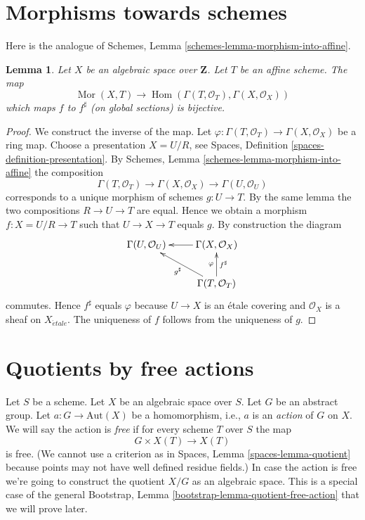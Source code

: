 \documentclass{stacks-project}
\theoremstyle{plain}
\newtheorem{lemma}[subsection]{Lemma}
\theoremstyle{definition}
\theoremstyle{remark}
\numberwithin{equation}{subsection}
\def\Hom{\mathop{\mathrm{Hom}}\nolimits}
\def\Mor{\mathop{\mathrm{Mor}}\nolimits}
\def\etale{{\acute{e}tale}}
\begin{document}
\section{Morphisms towards schemes}
\label{section-morphisms-to-schemes}

\noindent
Here is the analogue of
Schemes, Lemma \ref{schemes-lemma-morphism-into-affine}.

\begin{lemma}
\label{lemma-morphism-to-affine-scheme}
Let $X$ be an algebraic space over $\mathbf{Z}$.
Let $T$ be an affine scheme.
The map
$$
\Mor(X, T)
\longrightarrow
\Hom(\Gamma(T, \mathcal{O}_T), \Gamma(X, \mathcal{O}_X))
$$
which maps $f$ to $f^\sharp$ (on global sections) is bijective.
\end{lemma}

\begin{proof}
We construct the inverse of the map.
Let $\varphi : \Gamma(T, \mathcal{O}_T) \to \Gamma(X, \mathcal{O}_X)$
be a ring map. Choose a presentation $X = U/R$, see
Spaces, Definition \ref{spaces-definition-presentation}.
By
Schemes, Lemma \ref{schemes-lemma-morphism-into-affine}
the composition
$$
\Gamma(T, \mathcal{O}_T) \to \Gamma(X, \mathcal{O}_X) \to
\Gamma(U, \mathcal{O}_U)
$$
corresponds to a unique morphism of schemes $g : U \to T$. By the same lemma
the two compositions $R \to U \to T$ are equal. Hence we obtain a morphism
$f : X = U/R \to T$ such that $U \to X \to T$ equals $g$. By construction
the diagram
$$
\xymatrix{
\Gamma(U, \mathcal{O}_U) & \Gamma(X, \mathcal{O}_X) \ar[l] \\
& \Gamma(T, \mathcal{O}_T) \ar[lu]^{g^\sharp} \ar[u]^{\varphi}_{f^\sharp}
}
$$
commutes. Hence $f^\sharp$ equals $\varphi$ because $U \to X$ is an
\'etale covering and $\mathcal{O}_X$ is a sheaf on $X_\etale$.
The uniqueness of $f$ follows from the uniqueness of $g$.
\end{proof}





\section{Quotients by free actions}
\label{section-quotient-by-free}

\noindent
Let $S$ be a scheme.
Let $X$ be an algebraic space over $S$.
Let $G$ be an abstract group.
Let $a : G \to \text{Aut}(X)$ be a homomorphism, i.e., $a$ is an
{\it action} of $G$ on $X$. We will say the action is {\it free}
if for every scheme $T$ over $S$ the map
$$
G \times X(T) \longrightarrow X(T)
$$
is free. (We cannot use a criterion as in
Spaces, Lemma \ref{spaces-lemma-quotient}
because points may not have well defined residue fields.)
In case the action is free we're going to construct the quotient $X/G$
as an algebraic space. This is a special case of the general
Bootstrap, Lemma \ref{bootstrap-lemma-quotient-free-action}
that we will prove later.
\end{document}
